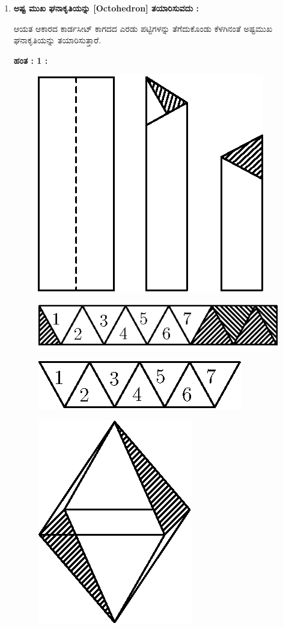 \begin{enumerate}
\item \textbf{ಅಷ್ಟ ಮುಖ ಘನಾಕೃತಿಯನ್ನು [Octohedron] ತಯಾರಿಸುವದು :}

ಆಯತ ಆಕಾರದ ಕಾರ್ಡಸೀಟ್ ಕಾಗದದ ಎರಡು ಪಟ್ಟಿಗಳನ್ನು ತೆಗೆದುಕೊಂಡು ಕೆಳಗಿನಂತೆ ಅಷ್ಟಮುಖ ಘನಾಕೃತಿಯನ್ನು ತಯಾರಿಸುತ್ತಾರೆ. 


\noindent
\textbf{ಹಂತ : 1 :}
\begin{figure}[H]
\centering
\includegraphics[scale=.98]{src/figure/chap1/fig1-20a.eps}
\end{figure}
\begin{figure}[H]
\centering
\includegraphics[scale=.98]{src/figure/chap1/fig1-20b.eps}
\end{figure}
\begin{figure}[H]
\centering
\includegraphics[scale=.98]{src/figure/chap1/fig1-20c.eps}
\end{figure}
\begin{figure}[H]
\centering
\includegraphics[scale=.98]{src/figure/chap1/fig1-20d.eps}

\end{figure}
\end{enumerate}
